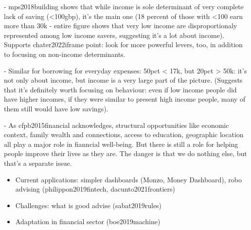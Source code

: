 



- mps2018building shows that while income is sole determinant of very complete
lack of saving (<100gbp), it's the main one (18 percent of those with <100 earn
more than 30k - entire figure shows that very low income are disproportionaly
represented among low income savers, suggesting it's a lot about income).
Supports chater2022iframe point: look for more powerful levers, too, in
addition to focusing on non-income determinants.

- Similar for borrowing for everyday expenses: 50pct < 17k, but 20pct > 50k:
it's not only about income, but income is a very large part of the picture.
(Suggests that it's definitely worth focusing on behaviour: even if low income
people did have higher incomes, if they were similar to present high income
people, many of them still would have low savings).

- As cfpb2015financial acknowledges, structural opportunities like economic
context, family wealth and connections, access to education, geographic
location all play a major role in fianncial well-being. But there is still a
role for helping people improve their lives as they are. The danger is that we
do nothing else, but that's a separate issue. 





\begin{itemize}
    \item Current applications: simpler dashboards (Monzo, Money Dashboard),
        robo advising (philippon2019fintech, dacunto2021frontiers)
    \item Challenges: what is good advise (sabat2019rules)

    \item Adaptation in financial sector (boe2019machine)
\end{itemize}




